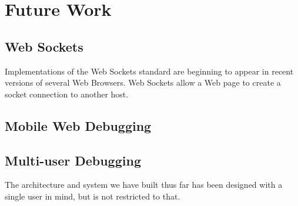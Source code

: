 \section {Future Work}
\subsection {Web Sockets}
Implementations of the Web Sockets standard are beginning to appear in recent
versions of several Web Browsers. Web Sockets allow a Web page to create a
socket connection to another host.
\subsection {Mobile Web Debugging}

\subsection {Multi-user Debugging}
The architecture and system we have built thus far has been designed with a
single user in mind, but is not restricted to that.
